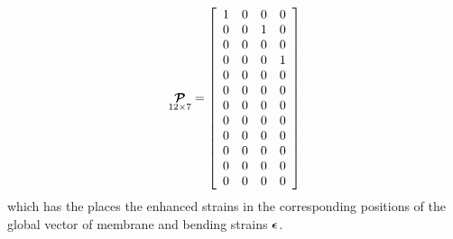 \begin{equation}
\underset{ 12 \times 7 }{ \T{\mathcal{P}} } =
\sqbr{ \matr{ c c c c  }{
1 & 0 & 0 & 0 \\
0 & 0 & 1 & 0 \\
0 & 0 & 0 & 0 \\
0 & 0 & 0 & 1 \\
0 & 0 & 0 & 0 \\
0 & 0 & 0 & 0 \\
0 & 0 & 0 & 0 \\
0 & 0 & 0 & 0 \\
0 & 0 & 0 & 0 \\
0 & 0 & 0 & 0 \\
0 & 0 & 0 & 0 \\
0 & 0 & 0 & 0
}}
\end{equation}
which has the places the enhanced strains in the corresponding positions of the global vector of membrane and bending strains $\T{\epsilon}$.
